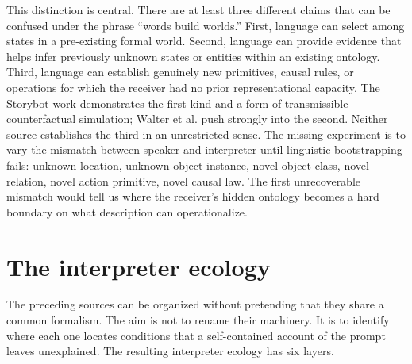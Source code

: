 \documentclass[11pt]{article}
\begin{document}
This distinction is central. There are at least three different claims that can be confused under the phrase ``words build worlds.'' First, language can select among states in a pre-existing formal world. Second, language can provide evidence that helps infer previously unknown states or entities within an existing ontology. Third, language can establish genuinely new primitives, causal rules, or operations for which the receiver had no prior representational capacity. The Storybot work demonstrates the first kind and a form of transmissible counterfactual simulation; Walter et al. push strongly into the second. Neither source establishes the third in an unrestricted sense. The missing experiment is to vary the mismatch between speaker and interpreter until linguistic bootstrapping fails: unknown location, unknown object instance, novel object class, novel relation, novel action primitive, novel causal law. The first unrecoverable mismatch would tell us where the receiver's hidden ontology becomes a hard boundary on what description can operationalize.

\section{The interpreter ecology}

The preceding sources can be organized without pretending that they share a common formalism. The aim is not to rename their machinery. It is to identify where each one locates conditions that a self-contained account of the prompt leaves unexplained. The resulting interpreter ecology has six layers.
\end{document}
